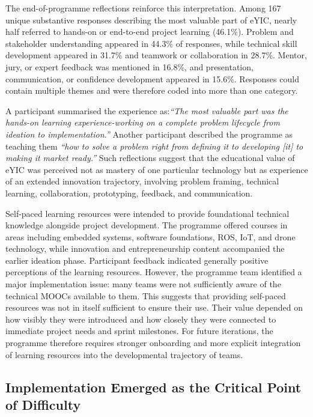 \documentclass[runningheads]{llncs}
\begin{document}
The end-of-programme reflections reinforce this interpretation. Among 167 unique substantive responses describing the most valuable part of eYIC, nearly half referred to hands-on or end-to-end project learning (46.1\%). Problem and stakeholder understanding appeared in 44.3\% of responses, while technical skill development appeared in 31.7\% and teamwork or collaboration in 28.7\%. Mentor, jury, or expert feedback was mentioned in 16.8\%, and presentation, communication, or confidence development appeared in 15.6\%. Responses could contain multiple themes and were therefore coded into more than one category.

A participant summarised the experience as:\emph{“The most valuable part was the hands-on learning experience-working on a complete problem lifecycle from ideation to implementation.”} Another participant described the programme as teaching them \emph{“how to solve a problem right from defining it to developing [it] to making it market ready.”} Such reflections suggest that the educational value of eYIC was perceived not as mastery of one particular technology but as experience of an extended innovation trajectory, involving problem framing, technical learning, collaboration, prototyping, feedback, and communication.

Self-paced learning resources were intended to provide foundational technical knowledge alongside project development. The programme offered courses in areas including embedded systems, software foundations, ROS, IoT, and drone technology, while innovation and entrepreneurship content accompanied the earlier ideation phase. Participant feedback indicated generally positive perceptions of the learning resources. However, the programme team identified a major implementation issue: many teams were not sufficiently aware of the technical MOOCs available to them. This suggests that providing self-paced resources was not in itself sufficient to ensure their use. Their value depended on how visibly they were introduced and how closely they were connected to immediate project needs and sprint milestones. For future iterations, the programme therefore requires stronger onboarding and more explicit integration of learning resources into the developmental trajectory of teams.

\subsection{Implementation Emerged as the Critical Point of Difficulty}
\end{document}
